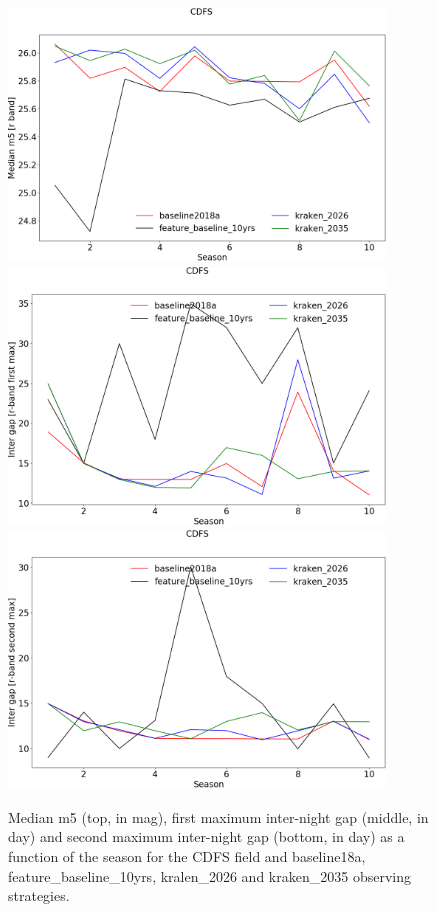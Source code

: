 \begin{figure}[htbp]
\begin{center}
  
  \includegraphics[width=10cm]{Figures/CDFS_med_m5.png}
  \includegraphics[width=10cm]{Figures/CDFS_intergap_max1.png}
    \includegraphics[width=10cm]{Figures/CDFS_intergap_max2.png}
 \caption{Median m5 (top, in mag), first maximum inter-night gap (middle, in day) and second maximum inter-night gap (bottom, in day)  as a function of the season for the CDFS field and baseline18a, feature\_baseline\_10yrs, kralen\_2026 and kraken\_2035 observing strategies.}\label{fig:cdfs_m5}
\end{center}
\end{figure}


